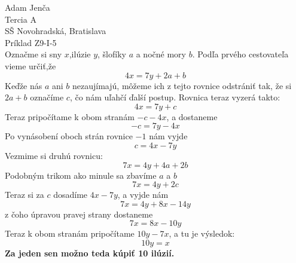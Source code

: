 \documentclass{article}
\begin{document}
\large
\noindent
Adam Jenča\\
Tercia A\\
SŠ Novohradská, Bratislava\\
Príklad Z9-I-5\\
\vskip 10mm \noindent
Označme si sny $x$,ilúzie $y$, šlofíky $a$ a nočné mory $b$.
Podľa prvého cestovateľa vieme určiť,že
$$
	4x = 7y + 2a + b
$$
Keďže nás $a$ ani $b$ nezaujímajú, môžeme ich z tejto rovnice odstrániť tak, že si $2a+b$ označíme $c$, čo nám uľahčí ďalší postup.
Rovnica teraz vyzerá takto:
$$
	4x = 7y + c
$$
Teraz pripočítame k obom stranám $-c-4x$, a dostaneme
$$
	-c = 7y - 4x
$$
Po vynásobení oboch strán rovnice $-1$ nám vyjde
$$
	c = 4x - 7y
$$
Vezmime si druhú rovnicu:
$$
	7x = 4y + 4a + 2b
$$
Podobným trikom ako minule sa zbavíme $a$ a $b$
$$
	7x = 4y + 2c
$$
Teraz si za $c$ dosadíme $4x-7y$, a vyjde nám
$$
	7x = 4y + 8x - 14y
$$
z čoho úpravou pravej strany dostaneme
$$
	7x = 8x - 10y
$$
Teraz k obom stranám pripočítame $10y - 7x$, a tu je výsledok:
$$
	10y = x
$$
\textbf{Za jeden sen možno teda kúpiť 10 ilúzií.}
\end{document}
